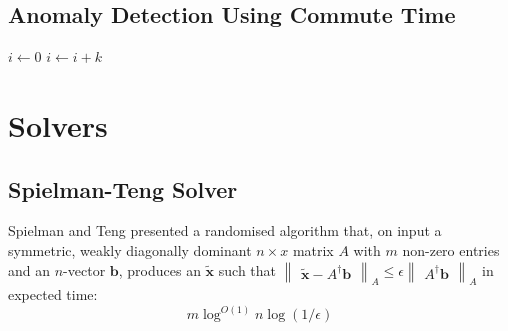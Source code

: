 \subsection{Anomaly Detection Using Commute Time}
\label{sec:anomalyDetectionUsingCommuteTime}

\begin{algorithmic}
    \State $i\gets 0$
\Else
        \State $i\gets i+k$
    \EndIf
\EndIf
\end{algorithmic}

\section{Solvers}
\label{sec:solvers}

\subsection{Spielman-Teng Solver}
\label{sec:spielmanTengSolver}
\nocite{Spielman:2006}
Spielman and Teng presented a randomised algorithm that, on input a symmetric, 
weakly diagonally dominant $n{\times}x$ matrix $A$ with $m$ non-zero entries and
an $n$-vector $\mathbf{b}$, produces an $\tilde{\mathbf{x}}$ such that 
$\begin{Vmatrix} \tilde{\textbf{x}} - A^{\dagger}\textbf{b} \end{Vmatrix}_{A} 
\leq \epsilon \begin{Vmatrix} A^{\dagger}\mathbf{b} \end{Vmatrix}_{A}$ in 
expected time:
\begin{displaymath}
m \log^{O(1)} n \log (1/\epsilon)
\end{displaymath}
